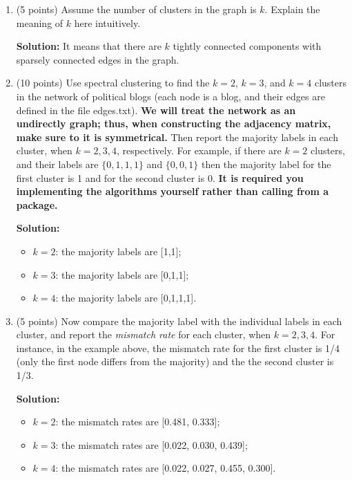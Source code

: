 \documentclass[twoside,10pt]{article}
\begin{document}
\begin{enumerate}
\item (5 points)  Assume the number of clusters in the graph is $k$. Explain the meaning of $k$ here intuitively. 
\begin{tcolorbox}
\textbf{Solution:} It means that there are $k$ tightly connected components with sparsely connected edges in the graph.
\end{tcolorbox}

\item (10 points) Use spectral clustering to find the $k = 2$, $k = 3$, and $k = 4$ clusters in the network of political blogs (each node is a blog, and their edges are defined in the file \textsf{edges.txt}). {\bf We will treat the network as an undirectly graph; thus, when constructing the adjacency matrix, make sure to it is symmetrical.} Then report the majority labels in each cluster, when $k = 2, 3, 4$, respectively. For example, if there are $k = 2$ clusters, and their labels are $\{0, 1, 1, 1\}$ and $\{0, 0, 1\}$ then the majority label for the first cluster is 1 and for the second cluster is 0. {\bf It is required you implementing the algorithms yourself rather than calling from a package.} 
\begin{tcolorbox}
\textbf{Solution:} 
\begin{itemize}
    \item $k = 2$: the majority labels are [1,1];
    \item $k = 3$: the majority labels are [0,1,1];
    \item $k = 4$: the majority labels are [0,1,1,1].
\end{itemize}
\end{tcolorbox}

\item (5 points) Now compare the majority label with the individual labels in each cluster, and report the {\it mismatch rate} for each cluster, when $k = 2, 3, 4$. For instance, in the example above, the mismatch rate for the first cluster is 1/4 (only the first node differs from the majority) and the the second cluster is 1/3. 
\begin{tcolorbox}
\textbf{Solution:} 
\begin{itemize}
    \item $k = 2$: the mismatch rates are [0.481, 0.333];
    \item $k = 3$: the mismatch rates are [0.022, 0.030, 0.439];
    \item $k = 4$: the mismatch rates are [0.022, 0.027, 0.455, 0.300].
\end{itemize}
\end{tcolorbox}


\end{enumerate}
\end{document}
